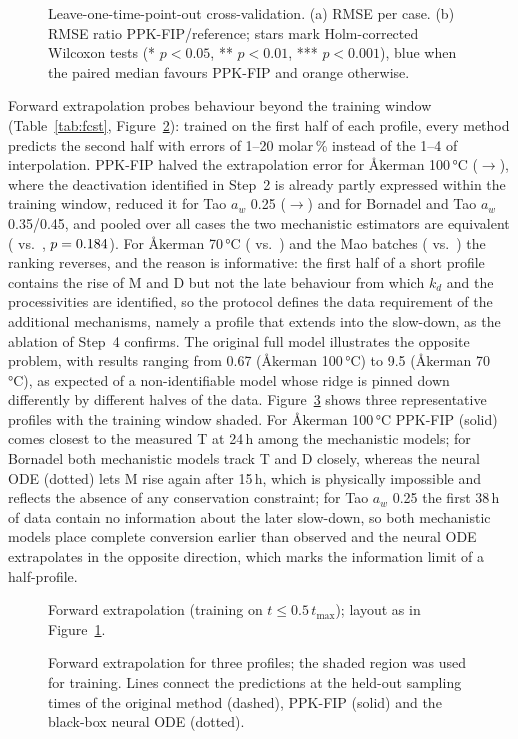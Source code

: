 \begin{figure}[!htbp]\centering{}\caption{Leave-one-time-point-out cross-validation. (a) RMSE per case. (b) RMSE ratio PPK-FIP/reference; stars mark Holm-corrected Wilcoxon tests (* $p<0.05$, ** $p<0.01$, *** $p<0.001$), blue when the paired median favours PPK-FIP and orange otherwise.}\label{fig:loto}\end{figure}

Forward extrapolation probes behaviour beyond the training window (Table~\ref{tab:fcst}, Figure~\ref{fig:fcstbars}): trained on the first half of each profile, every method predicts the second half with errors of 1--20 molar\,\% instead of the 1--4 of interpolation. PPK-FIP halved the extrapolation error for Åkerman 100\,°C (\FcstAkHundredOrig$\to$\FcstAkHundredNew), where the deactivation identified in Step~2 is already partly expressed within the training window, reduced it for Tao $a_w$ 0.25 (\FcstTaoAOrig$\to$\FcstTaoANew) and for Bornadel and Tao $a_w$ 0.35/0.45, and pooled over all cases the two mechanistic estimators are equivalent (\FcstAllNew{} vs.\ \FcstAllOrig, $p=0.184$). For Åkerman 70\,°C (\FcstAkSeventyOrig{} vs.\ \FcstAkSeventyNew) and the Mao batches (\FcstMaoOrig{} vs.\ \FcstMaoNew) the ranking reverses, and the reason is informative: the first half of a short profile contains the rise of M and D but not the late behaviour from which $k_d$ and the processivities are identified, so the protocol defines the data requirement of the additional mechanisms, namely a profile that extends into the slow-down, as the ablation of Step~4 confirms. The original full model illustrates the opposite problem, with results ranging from 0.67 (Åkerman 100\,°C) to 9.5 (Åkerman 70\,°C), as expected of a non-identifiable model whose ridge is pinned down differently by different halves of the data. Figure~\ref{fig:fcst} shows three representative profiles with the training window shaded. For Åkerman 100\,°C PPK-FIP (solid) comes closest to the measured T at 24\,h among the mechanistic models; for Bornadel both mechanistic models track T and D closely, whereas the neural ODE (dotted) lets M rise again after 15\,h, which is physically impossible and reflects the absence of any conservation constraint; for Tao $a_w$ 0.25 the first 38\,h of data contain no information about the later slow-down, so both mechanistic models place complete conversion earlier than observed and the neural ODE extrapolates in the opposite direction, which marks the information limit of a half-profile.
\begin{figure}[!htbp]\centering{}\caption{Forward extrapolation (training on $t\le0.5\,t_\mathrm{max}$); layout as in Figure~\ref{fig:loto}.}\label{fig:fcstbars}\end{figure}
\begin{figure}[!htbp]\centering{}\caption{Forward extrapolation for three profiles; the shaded region was used for training. Lines connect the predictions at the held-out sampling times of the original method (dashed), PPK-FIP (solid) and the black-box neural ODE (dotted).}\label{fig:fcst}\end{figure}


